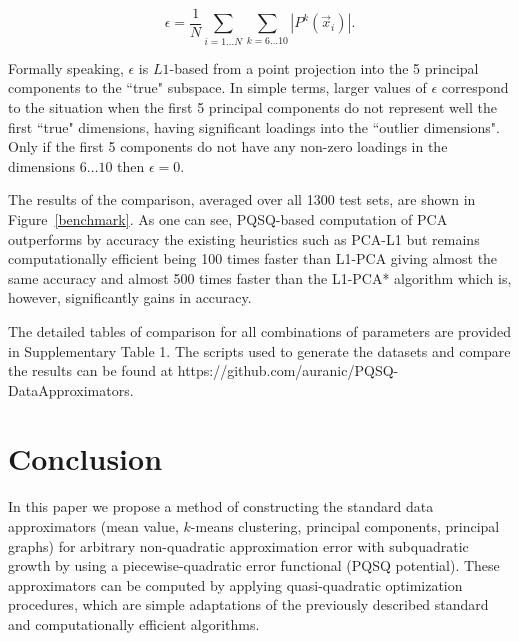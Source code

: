 \documentclass[preprint,12pt,twocolumn]{elsarticle}
\begin{document}
\begin{equation}
\epsilon = \frac{1}{N}\sum_{i=1\dots N} \sum_{k=6\dots 10} |P^k(\vec{x}_i)|.
\end{equation}

Formally speaking, $\epsilon$ is $L1$-based from a point projection into the 5 principal components to the ``true" subspace. In simple terms, larger values of $\epsilon$ correspond to the situation when the first 5 principal components do not represent well the first ``true" dimensions, having significant loadings into the ``outlier dimensions". Only if the first 5 components do not have any non-zero loadings in the dimensions $6\dots 10$ then $\epsilon=0$.

The results of the comparison, averaged over all 1300 test sets, are shown in Figure~\ref{benchmark}. As one can see, PQSQ-based computation of PCA outperforms by accuracy the existing heuristics such as PCA-L1 but remains computationally efficient being 100 times faster than L1-PCA giving almost the same accuracy and almost 500 times faster than the L1-PCA* algorithm which is, however, significantly gains in accuracy. 

The detailed tables of comparison for all combinations of parameters are provided in Supplementary Table 1. The scripts used to generate the datasets and compare the results can be found at https://github.com/auranic/PQSQ-DataApproximators.

\section{Conclusion}

In this paper we propose a method of constructing the standard data approximators (mean value, $k$-means clustering, principal components, principal graphs)
for arbitrary non-quadratic approximation error with subquadratic growth by using a piecewise-quadratic error functional (PQSQ potential). These approximators can be computed
by applying quasi-quadratic optimization procedures, which are simple adaptations of the previously described standard and computationally efficient algorithms.
\end{document}
